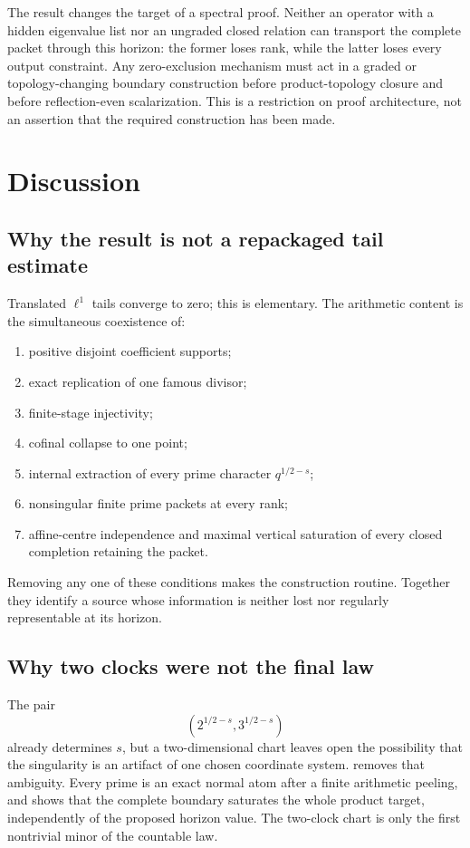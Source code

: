 \documentclass[11pt]{article}
\theoremstyle{definition}
\theoremstyle{remark}
\begin{document}
The result changes the target of a spectral proof.  Neither an operator with
a hidden eigenvalue list nor an ungraded closed relation can transport the
complete packet through this horizon: the former loses rank, while the latter
loses every output constraint.  Any zero-exclusion mechanism must act in a
graded or topology-changing boundary construction before product-topology
closure and before reflection-even scalarization.  This is a restriction on
proof architecture, not an assertion that the required construction has been
made.

\section{Discussion}

\subsection{Why the result is not a repackaged tail estimate}

Translated \(\ell^1\) tails converge to zero; this is elementary.  The
arithmetic content is the simultaneous coexistence of:

\begin{enumerate}[leftmargin=2.1em]
\item positive disjoint coefficient supports;
\item exact replication of one famous divisor;
\item finite-stage injectivity;
\item cofinal collapse to one point;
\item internal extraction of every prime character \(q^{1/2-s}\);
\item nonsingular finite prime packets at every rank;
\item affine-centre independence and maximal vertical saturation of every
      closed completion retaining the packet.
\end{enumerate}

Removing any one of these conditions makes the construction routine.
Together they identify a source whose information is neither lost nor
regularly representable at its horizon.

\subsection{Why two clocks were not the final law}

The pair
\[
                     (2^{1/2-s},3^{1/2-s})
\]
already determines \(s\), but a two-dimensional chart leaves open the
possibility that the singularity is an artifact of one chosen coordinate
system.   removes that ambiguity.  Every prime is
an exact normal atom after a finite arithmetic peeling, and
 shows that the complete boundary saturates the whole product
target, independently of the proposed horizon value.  The two-clock chart is
only the first nontrivial minor of the countable law.
\end{document}
